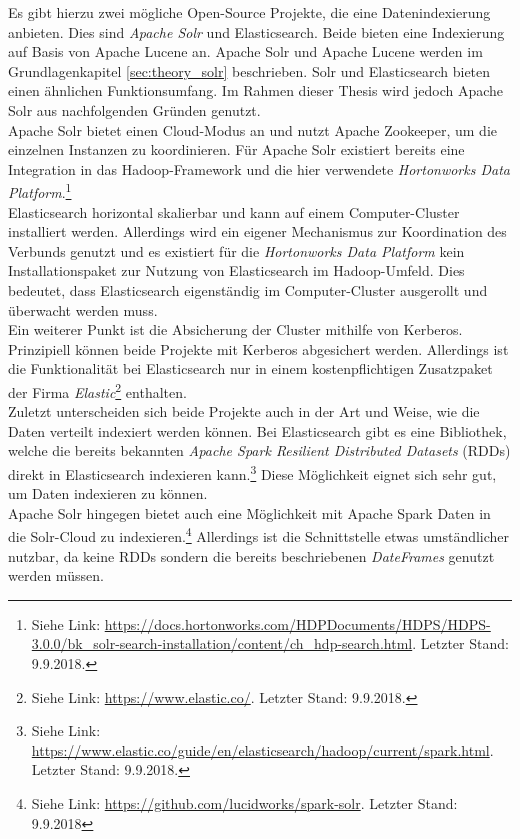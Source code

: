 \noindent 
Es gibt hierzu zwei mögliche Open-Source Projekte, die eine Datenindexierung anbieten. Dies sind \textit{Apache Solr\texttrademark} und Elasticsearch\texttrademark. Beide bieten eine Indexierung auf Basis von Apache Lucene an. Apache Solr und Apache Lucene werden im Grundlagenkapitel \ref{sec:theory_solr} beschrieben. Solr und Elasticsearch bieten einen ähnlichen Funktionsumfang. Im Rahmen dieser Thesis wird jedoch Apache Solr aus nachfolgenden Gründen genutzt.\\
Apache Solr bietet einen Cloud-Modus an und nutzt Apache Zookeeper, um die einzelnen Instanzen zu koordinieren. Für Apache Solr existiert bereits eine Integration in das Hadoop-Framework und die hier verwendete \textit{Hortonworks Data Platform}.\footnote{Siehe Link: \url{https://docs.hortonworks.com/HDPDocuments/HDPS/HDPS-3.0.0/bk_solr-search-installation/content/ch_hdp-search.html}. Letzter Stand: 9.9.2018.}\\
Elasticsearch horizontal skalierbar und kann auf einem Computer-Cluster installiert werden. Allerdings wird ein eigener Mechanismus zur Koordination des Verbunds genutzt und es existiert für die \textit{Hortonworks Data Platform} kein Installationspaket zur Nutzung von Elasticsearch im Hadoop-Umfeld. Dies bedeutet, dass Elasticsearch eigenständig im Computer-Cluster ausgerollt und überwacht werden muss.\\

\noindent
Ein weiterer Punkt ist die Absicherung der Cluster mithilfe von Kerberos. Prinzipiell können beide Projekte mit Kerberos abgesichert werden. Allerdings ist die Funktionalität bei Elasticsearch nur in einem kostenpflichtigen Zusatzpaket der Firma \textit{Elastic}\footnote{Siehe Link: \url{https://www.elastic.co/}. Letzter Stand: 9.9.2018.} enthalten.\\

\noindent
Zuletzt unterscheiden sich beide Projekte auch in der Art und Weise, wie die Daten verteilt indexiert werden können. Bei Elasticsearch gibt es eine Bibliothek, welche die bereits bekannten \textit{Apache Spark Resilient Distributed Datasets} (RDDs) direkt in Elasticsearch indexieren kann.\footnote{Siehe Link: \url{https://www.elastic.co/guide/en/elasticsearch/hadoop/current/spark.html}. Letzter Stand: 9.9.2018.} Diese Möglichkeit eignet sich sehr gut, um Daten indexieren zu können.\\
Apache Solr hingegen bietet auch eine Möglichkeit mit Apache Spark Daten in die Solr-Cloud zu indexieren.\footnote{Siehe Link: \url{https://github.com/lucidworks/spark-solr}. Letzter Stand: 9.9.2018} Allerdings ist die Schnittstelle etwas umständlicher nutzbar, da keine RDDs sondern die bereits beschriebenen \textit{DateFrames} genutzt werden müssen.\\

